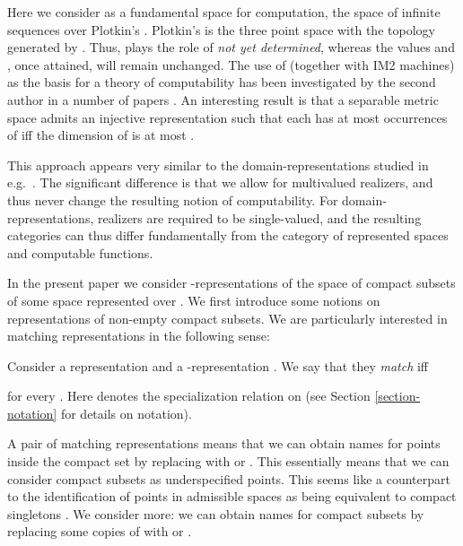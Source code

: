 \documentclass{eptcs-modified}
\begin{document}
Here we consider  as a fundamental space for computation, the space of infinite sequences over Plotkin's . Plotkin's  is the three point space  with the topology generated by . Thus,  plays the role of \emph{not yet determined}, whereas the values  and , once attained, will remain unchanged. The use of  (together with IM2 machines) as the basis for a theory of computability has been investigated by the second author in a number of papers \cite{tsuiki,tsuiki4,tsuiki3}. An interesting result is that a separable
metric space  admits an injective representation  such that each  has at most  occurrences of  iff the dimension of  is at most .

This approach appears very similar to the domain-representations studied in e.g.~\cite{blanck}. The significant difference is that we allow for multivalued realizers,
and thus never change the resulting notion of computability. For domain-representations, realizers are required to be single-valued, and the resulting categories can thus differ fundamentally from the category of represented spaces and computable functions.

In the present paper we consider -representations of the space  of compact subsets of some space  represented over . We first introduce some notions on representations of non-empty compact subsets.
We are particularly interested in matching representations in the following sense:

\begin{definition}\label{def:match}
Consider a representation  and a -representation . We say that they \emph{match} iff

for every .
Here  denotes the specialization relation on 
(see Section \ref{section-notation} for details on notation).
\end{definition}



A pair of matching representations means that we can obtain names for points inside the compact set by replacing  with  or .
This essentially means that we can consider compact subsets as underspecified points. This seems like a counterpart to the identification of points in admissible spaces as being equivalent to compact singletons \cite{schroder5,pauly-synthetic}.
We consider more: we can obtain names for compact subsets
by replacing some copies of  with  or .
\end{document}
